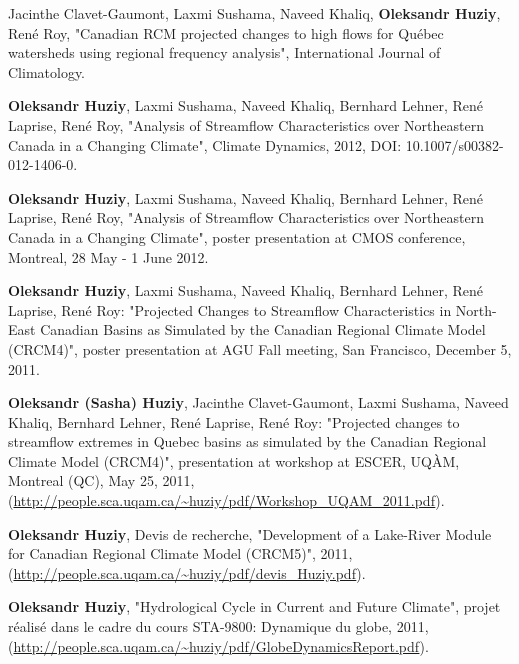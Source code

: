 \documentclass[letterpaper]{article}
\renewenvironment{itemize}{
  \begin{list}{}{
    \setlength{\leftmargin}{1.5em}
  }
}{
  \end{list}
}
\begin{document}
\begin{itemize}
   
    \item Jacinthe Clavet-Gaumont, Laxmi Sushama, Naveed Khaliq,
    \textbf{Oleksandr Huziy}, René Roy, "Canadian RCM projected changes to high
    flows for Québec watersheds using regional frequency analysis", International Journal of Climatology.
    
    \item \textbf{Oleksandr Huziy}, Laxmi Sushama, Naveed Khaliq, Bernhard
    Lehner, René Laprise, René Roy, "Analysis of Streamflow Characteristics over Northeastern Canada 
     in a Changing Climate", Climate Dynamics, 2012, DOI:
     10.1007/s00382-012-1406-0.
    \item \textbf{Oleksandr Huziy}, Laxmi Sushama, Naveed Khaliq, Bernhard Lehner,
     René Laprise, René Roy, "Analysis of Streamflow Characteristics over Northeastern Canada 
     in a Changing Climate", poster presentation at CMOS conference, Montreal,
     28 May - 1 June 2012.
    \item \textbf{Oleksandr Huziy}, Laxmi Sushama, Naveed Khaliq, Bernhard Lehner, René
    Laprise, René Roy: "Projected Changes to Streamflow Characteristics in
    North-East Canadian Basins as Simulated by the Canadian Regional Climate
    Model (CRCM4)", poster presentation at AGU Fall meeting, San Francisco,
    December 5, 2011.
    \item \textbf{Oleksandr (Sasha) Huziy}, Jacinthe Clavet-Gaumont, Laxmi
    Sushama, Naveed Khaliq, Bernhard Lehner, René Laprise, René Roy: "Projected changes to streamflow extremes in Quebec
    basins as simulated by the Canadian Regional Climate Model (CRCM4)",
    presentation at workshop at ESCER, UQÀM, Montreal (QC), May 25, 2011,
    (\url{http://people.sca.uqam.ca/~huziy/pdf/Workshop_UQAM_2011.pdf}).
   
    \item \textbf{Oleksandr Huziy}, Devis de recherche, "Development of a
    Lake-River Module for Canadian Regional Climate Model (CRCM5)", 2011,
    (\url{http://people.sca.uqam.ca/~huziy/pdf/devis_Huziy.pdf}).
   
    \item \textbf{Oleksandr Huziy}, "Hydrological Cycle in Current and Future Climate",
    projet réalisé dans le cadre du cours STA-9800: Dynamique du globe, 2011,\\
     (\url{http://people.sca.uqam.ca/~huziy/pdf/GlobeDynamicsReport.pdf}).
   

\end{itemize}
\end{document}
